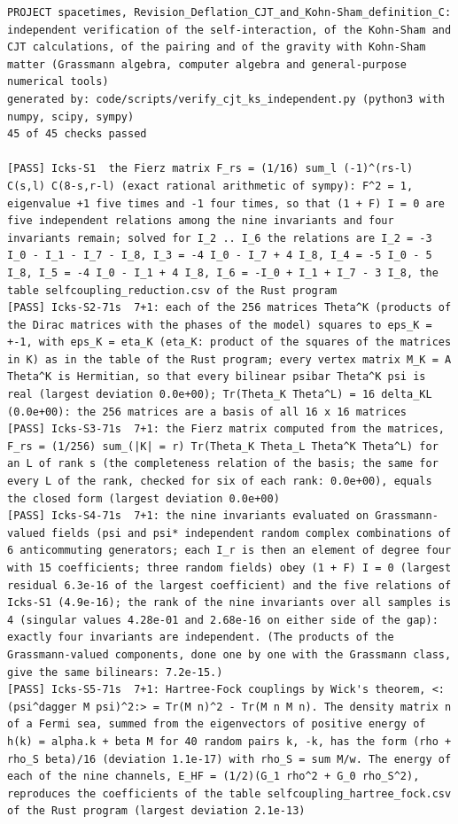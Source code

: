 \documentclass[
  10pt,
]{article}
\begin{document}
\begin{verbatim}
PROJECT spacetimes, Revision_Deflation_CJT_and_Kohn-Sham_definition_C: independent verification of the self-interaction, of the Kohn-Sham and CJT calculations, of the pairing and of the gravity with Kohn-Sham matter (Grassmann algebra, computer algebra and general-purpose numerical tools)
generated by: code/scripts/verify_cjt_ks_independent.py (python3 with numpy, scipy, sympy)
45 of 45 checks passed

[PASS] Icks-S1  the Fierz matrix F_rs = (1/16) sum_l (-1)^(rs-l) C(s,l) C(8-s,r-l) (exact rational arithmetic of sympy): F^2 = 1, eigenvalue +1 five times and -1 four times, so that (1 + F) I = 0 are five independent relations among the nine invariants and four invariants remain; solved for I_2 .. I_6 the relations are I_2 = -3 I_0 - I_1 - I_7 - I_8, I_3 = -4 I_0 - I_7 + 4 I_8, I_4 = -5 I_0 - 5 I_8, I_5 = -4 I_0 - I_1 + 4 I_8, I_6 = -I_0 + I_1 + I_7 - 3 I_8, the table selfcoupling_reduction.csv of the Rust program
[PASS] Icks-S2-71s  7+1: each of the 256 matrices Theta^K (products of the Dirac matrices with the phases of the model) squares to eps_K = +-1, with eps_K = eta_K (eta_K: product of the squares of the matrices in K) as in the table of the Rust program; every vertex matrix M_K = A Theta^K is Hermitian, so that every bilinear psibar Theta^K psi is real (largest deviation 0.0e+00); Tr(Theta_K Theta^L) = 16 delta_KL (0.0e+00): the 256 matrices are a basis of all 16 x 16 matrices
[PASS] Icks-S3-71s  7+1: the Fierz matrix computed from the matrices, F_rs = (1/256) sum_(|K| = r) Tr(Theta_K Theta_L Theta^K Theta^L) for an L of rank s (the completeness relation of the basis; the same for every L of the rank, checked for six of each rank: 0.0e+00), equals the closed form (largest deviation 0.0e+00)
[PASS] Icks-S4-71s  7+1: the nine invariants evaluated on Grassmann-valued fields (psi and psi* independent random complex combinations of 6 anticommuting generators; each I_r is then an element of degree four with 15 coefficients; three random fields) obey (1 + F) I = 0 (largest residual 6.3e-16 of the largest coefficient) and the five relations of Icks-S1 (4.9e-16); the rank of the nine invariants over all samples is 4 (singular values 4.28e-01 and 2.68e-16 on either side of the gap): exactly four invariants are independent. (The products of the Grassmann-valued components, done one by one with the Grassmann class, give the same bilinears: 7.2e-15.)
[PASS] Icks-S5-71s  7+1: Hartree-Fock couplings by Wick's theorem, <:(psi^dagger M psi)^2:> = Tr(M n)^2 - Tr(M n M n). The density matrix n of a Fermi sea, summed from the eigenvectors of positive energy of h(k) = alpha.k + beta M for 40 random pairs k, -k, has the form (rho + rho_S beta)/16 (deviation 1.1e-17) with rho_S = sum M/w. The energy of each of the nine channels, E_HF = (1/2)(G_1 rho^2 + G_0 rho_S^2), reproduces the coefficients of the table selfcoupling_hartree_fock.csv of the Rust program (largest deviation 2.1e-13)

\end{verbatim}
\end{document}

